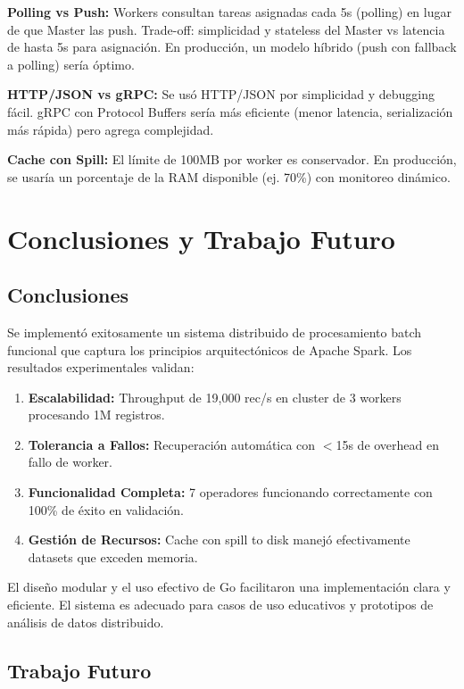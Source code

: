 \documentclass[conference]{IEEEtran}
\begin{document}
\textbf{Polling vs Push:} Workers consultan tareas asignadas cada 5s (polling) en lugar de que Master las push. Trade-off: simplicidad y stateless del Master vs latencia de hasta 5s para asignación. En producción, un modelo híbrido (push con fallback a polling) sería óptimo.

\textbf{HTTP/JSON vs gRPC:} Se usó HTTP/JSON por simplicidad y debugging fácil. gRPC con Protocol Buffers sería más eficiente (menor latencia, serialización más rápida) pero agrega complejidad.

\textbf{Cache con Spill:} El límite de 100MB por worker es conservador. En producción, se usaría un porcentaje de la RAM disponible (ej. 70\%) con monitoreo dinámico.

\section{Conclusiones y Trabajo Futuro}\label{sec:conclusiones}

\subsection{Conclusiones}

Se implementó exitosamente un sistema distribuido de procesamiento batch funcional que captura los principios arquitectónicos de Apache Spark. Los resultados experimentales validan:

\begin{enumerate}
\item \textbf{Escalabilidad:} Throughput de 19,000 rec/s en cluster de 3 workers procesando 1M registros.
\item \textbf{Tolerancia a Fallos:} Recuperación automática con $<$15s de overhead en fallo de worker.
\item \textbf{Funcionalidad Completa:} 7 operadores funcionando correctamente con 100\% de éxito en validación.
\item \textbf{Gestión de Recursos:} Cache con spill to disk manejó efectivamente datasets que exceden memoria.
\end{enumerate}

El diseño modular y el uso efectivo de Go facilitaron una implementación clara y eficiente. El sistema es adecuado para casos de uso educativos y prototipos de análisis de datos distribuido.

\subsection{Trabajo Futuro}
\end{document}
